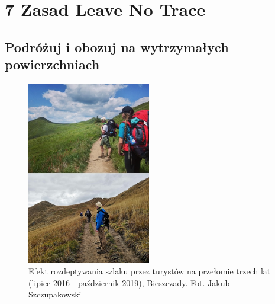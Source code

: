 \documentclass[11pt,fleqn]{book} %
\begin{document}

\pagestyle{empty} %

\tableofcontents %

\cleardoublepage %

\pagestyle{fancy} %


\usechapterimagetrue

\part{7 Zasad Leave No Trace}





\chapter{Podróżuj i obozuj na wytrzymałych powierzchniach}
\label{rule2-camp-and-travel}

\lipsum 

\begin{figure}
	\begin{center}
		\includegraphics[width=0.48\textwidth]{zasady/2/szlak}
	\end{center}
	\caption{Efekt rozdeptywania szlaku przez turystów na przełomie trzech lat (lipiec 2016 - październik 2019), Bieszczady. Fot. Jakub Szczupakowski}
\end{figure}
\end{document}
